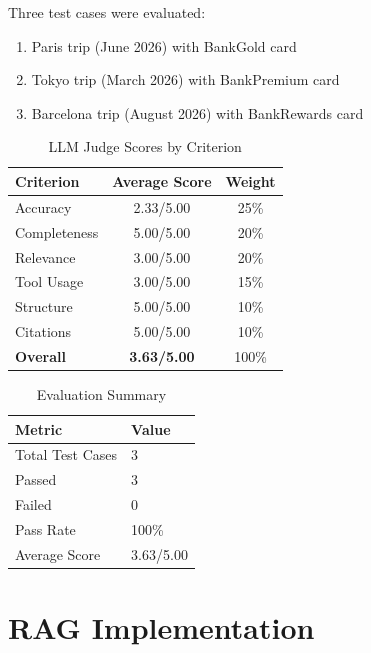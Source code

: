\documentclass[11pt,a4paper]{article}
\begin{document}
Three test cases were evaluated:

\begin{enumerate}
    \item Paris trip (June 2026) with BankGold card
    \item Tokyo trip (March 2026) with BankPremium card
    \item Barcelona trip (August 2026) with BankRewards card
\end{enumerate}

\begin{table}[H]
\centering
\caption{LLM Judge Scores by Criterion}
\begin{tabular}{lcc}
\toprule
\textbf{Criterion} & \textbf{Average Score} & \textbf{Weight} \\
\midrule
Accuracy & 2.33/5.00 & 25\% \\
Completeness & 5.00/5.00 & 20\% \\
Relevance & 3.00/5.00 & 20\% \\
Tool Usage & 3.00/5.00 & 15\% \\
Structure & 5.00/5.00 & 10\% \\
Citations & 5.00/5.00 & 10\% \\
\midrule
\textbf{Overall} & \textbf{3.63/5.00} & 100\% \\
\bottomrule
\end{tabular}
\end{table}

\begin{table}[H]
\centering
\caption{Evaluation Summary}
\begin{tabular}{ll}
\toprule
\textbf{Metric} & \textbf{Value} \\
\midrule
Total Test Cases & 3 \\
Passed & 3 \\
Failed & 0 \\
Pass Rate & 100\% \\
Average Score & 3.63/5.00 \\
\bottomrule
\end{tabular}
\end{table}

\newpage

\section{RAG Implementation}
\end{document}
